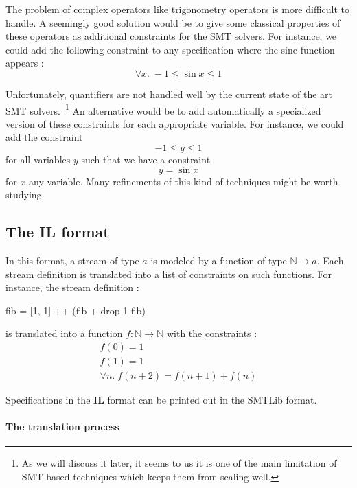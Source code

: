 \medskip

The problem of complex operators like trigonometry operators is more difficult to handle. A seemingly good solution would be to give some classical properties of these operators as additional constraints for the SMT solvers. For instance, we could add the following constraint to any specification where the sine function appears : \[ \forall x . \; -1 \leq \sin x \leq 1 \]

Unfortunately, quantifiers are not handled well by the current state of the art SMT solvers.~\footnote{As we will discuss it later, it seems to us it is one of the main limitation of SMT-based techniques which keeps them from scaling well.} An alternative would be to add automatically a specialized version of these constraints for each appropriate variable. For instance, we could add the constraint \[-1 \leq y \leq 1 \] for all variables $y$ such that we have a constraint \[ y = \sin x \] for $x$ any variable. Many refinements of this kind of techniques might be worth studying.





\subsection{The \textbf{IL} format}

In this format, a stream of type $a$ is modeled by a function of type $\mathbb{N} \to a$. Each stream definition is translated into a list of constraints on such functions. For instance, the stream definition :
\begin{code}
fib = [1, 1] ++ (fib + drop 1 fib)
\end{code}
is translated into a function $f : \mathbb{N} \to \mathbb{N}$ with the constraints :
$$
\begin{array}{c}
f(0) = 1 \\
f(1) = 1 \\
\forall n . \; f(n + 2) = f(n + 1) + f(n)
\end{array}
$$

\medskip

Specifications in the \textbf{IL} format can be printed out in the SMTLib format.

\paragraph{The translation process} 

